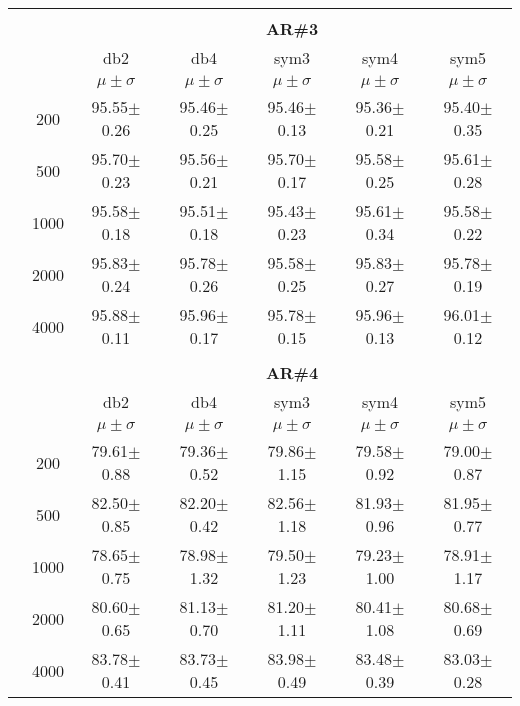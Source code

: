 \begin{table}[H]
\begin{tabular}{|c|c|c c c c c|}
\\ \midrule
\multicolumn{7}{c}{}\\ 



\cline{3-7}
\multicolumn{2}{c|}{\multirow{3}{*}{}} & \multicolumn{5}{c|}{\textbf{AR\#3}}   \\\cline{3-7} 
\multicolumn{2}{c|}{}  & db2 & db4 & sym3 & sym4 & sym5 \\\cline{3-7}%
\multicolumn{2}{c|}{}& $\mu \pm \sigma$ & $\mu \pm \sigma$ & $\mu \pm \sigma$ & $\mu \pm \sigma$ & $\mu \pm \sigma$ \\\hline

\multicolumn{1}{|c|}{ \multirow{5}{*}{\rotatebox[origin=c]{90}{\textbf{Neurônios}}} }
&200	&95.55$\pm$0.26	&95.46$\pm$0.25	&95.46$\pm$0.13	&95.36$\pm$0.21	&95.40$\pm$0.35\\\cline{2-7}
&500	&95.70$\pm$0.23	&95.56$\pm$0.21	&95.70$\pm$0.17	&95.58$\pm$0.25	&95.61$\pm$0.28\\\cline{2-7}
&1000	&95.58$\pm$0.18	&95.51$\pm$0.18	&95.43$\pm$0.23	&95.61$\pm$0.34	&95.58$\pm$0.22\\\cline{2-7}
&2000	&95.83$\pm$0.24	&95.78$\pm$0.26	&95.58$\pm$0.25	&95.83$\pm$0.27	&95.78$\pm$0.19\\\cline{2-7}
&4000	&95.88$\pm$0.11	&95.96$\pm$0.17	&95.78$\pm$0.15	&95.96$\pm$0.13	&96.01$\pm$0.12

 
\\\midrule

\multicolumn{7}{c}{}\\ 

\cline{3-7}
\multicolumn{2}{c|}{\multirow{3}{*}{}} & \multicolumn{5}{c|}{\textbf{AR\#4}}   \\\cline{3-7} 
\multicolumn{2}{c|}{}  & db2 & db4 & sym3 & sym4 & sym5 \\\cline{3-7}%
\multicolumn{2}{c|}{}& $\mu \pm \sigma$ & $\mu \pm \sigma$ & $\mu \pm \sigma$ & $\mu \pm \sigma$ & $\mu \pm \sigma$ \\\hline
&200	&79.61$\pm$0.88	&79.36$\pm$0.52	&79.86$\pm$1.15	&79.58$\pm$0.92	&79.00$\pm$0.87\\\cline{2-7}
&500	&82.50$\pm$0.85	&82.20$\pm$0.42	&82.56$\pm$1.18	&81.93$\pm$0.96	&81.95$\pm$0.77\\\cline{2-7}
&1000	&78.65$\pm$0.75	&78.98$\pm$1.32	&79.50$\pm$1.23	&79.23$\pm$1.00	&78.91$\pm$1.17\\\cline{2-7}
&2000	&80.60$\pm$0.65	&81.13$\pm$0.70	&81.20$\pm$1.11	&80.41$\pm$1.08	&80.68$\pm$0.69\\\cline{2-7}
&4000	&83.78$\pm$0.41	&83.73$\pm$0.45	&83.98$\pm$0.49	&83.48$\pm$0.39	&83.03$\pm$0.28\\\midrule
\end{tabular}
\end{table}






